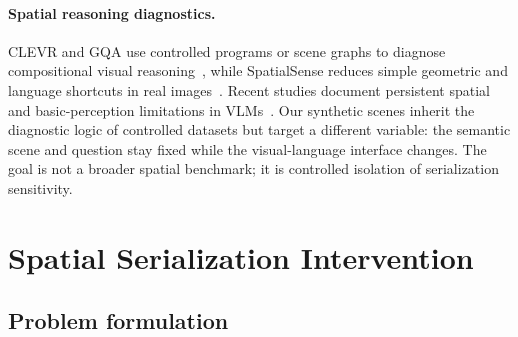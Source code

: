 \documentclass[10pt,twocolumn,letterpaper]{article}
\begin{document}
\paragraph{Spatial reasoning diagnostics.}
CLEVR and GQA use controlled programs or scene graphs to diagnose compositional visual reasoning~\cite{johnson2017clevr,hudson2019gqa}, while SpatialSense reduces simple geometric and language shortcuts in real images~\cite{yang2019spatialsense}.
Recent studies document persistent spatial and basic-perception limitations in VLMs~\cite{chen2024spatialvlm,tong2024eyes}.
Our synthetic scenes inherit the diagnostic logic of controlled datasets but target a different variable: the semantic scene and question stay fixed while the visual-language interface changes.
The goal is not a broader spatial benchmark; it is controlled isolation of serialization sensitivity.

\section{Spatial Serialization Intervention}
\label{sec:method}

\subsection{Problem formulation}
\end{document}
